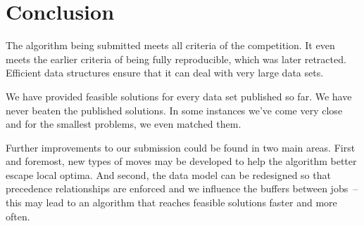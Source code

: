 \documentclass[10pt,a4paper]{article}
\begin{document}
\section{Conclusion}

The algorithm being submitted meets all criteria of the competition. It even meets the earlier criteria of being fully reproducible, which was later retracted. Efficient data structures ensure that it can deal with very large data sets.

We have provided feasible solutions for every data set published so far. We have never beaten the published solutions. In some instances we've come very close and for the smallest problems, we even matched them.

Further improvements to our submission could be found in two main areas. First and foremost, new types of moves may be developed to help the algorithm better escape local optima. And second, the data model can be redesigned so that precedence relationships are enforced and we influence the buffers between jobs~-- this may lead to an algorithm that reaches feasible solutions faster and more often.
\end{document}
